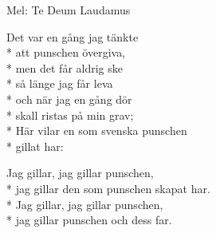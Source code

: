 \begin{SongText}
    \begin{SongInfo}
        Mel: Te Deum Laudamus
    \end{SongInfo}
    \begin{SongVerse}
        Det var en gång jag tänkte\\*%
        att punschen övergiva,\\*%
        men det får aldrig ske\\*%
        så länge jag får leva\\*%
        och när jag en gång dör\\*%
        skall ristas på min grav;\\*%
        Här vilar en som svenska punschen\\*%
        gillat har:
    \end{SongVerse}
    \begin{SongVerse}
        Jag gillar, jag gillar punschen,\\*%
        jag gillar den som punschen skapat har.\\*%
        Jag gillar, jag gillar punschen,\\*%
        jag gillar punschen och dess far.
    \end{SongVerse}
\end{SongText}
\newpage